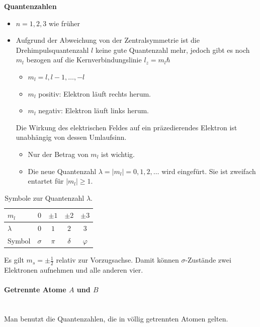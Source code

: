 \textbf{Quantenzahlen}
\begin{itemize}
	\item $n = 1,2,3$ wie früher
	\item Aufgrund der Abweichung von der Zentralsymmetrie ist die Drehimpulsquantenzahl $l$ keine gute Quantenzahl mehr, jedoch gibt es noch $m_{l}$ bezogen auf die Kernverbindungslinie $l_{z} = m_{l} \hbar $
		\begin{itemize}
			\item $m_{l} = l, l-1 ,\ldots, -l$ 
			\item $m_{l} $ positiv: Elektron läuft rechts herum.
			\item $m_{l} $ negativ: Elektron läuft links herum.
		\end{itemize}
		Die Wirkung des elektrischen Feldes auf ein präzedierendes Elektron ist unabhängig von dessen Umlaufsinn.
		\begin{itemize}[label= $\to$]
			\item Nur der Betrag von $m_{l}$ ist wichtig.
			\item Die neue Quantenzahl $ \lambda = \left| m_{l} \right| = 0, 1, 2, \ldots$ wird eingefürt. Sie ist zweifach entartet für $\left| m_{l} \right| \ge 1.$
		\end{itemize}
\end{itemize}

\begin{table}[htpb]
	\centering
	\caption{Symbole zur Quantenzahl $\lambda$.}
	\label{tab:label}
	\begin{tabular}{|l|c|c|c|c|}
	\hline
	$m_{l}$   & $0$       & $\pm 1$& $\pm 2$   & $\pm 3$     \\
	\hline
	\hline
	$\lambda$ & $0$       & $1$    & $2$       & $3$         \\
	\hline
	Symbol    & $ \sigma$ & $ \pi$ & $ \delta$ & $ \varphi$  \\
	\hline
	\end{tabular}
\end{table}
Es gilt $m_{s}= \pm \frac{1}{2}$ relativ zur Vorzugsachse. Damit können $ \sigma$-Zustände zwei Elektronen aufnehmen und alle anderen vier.\\

\paragraph{Getrennte Atome $A$ und $B$}~\\
Man benutzt die Quantenzahlen, die in völlig getrennten Atomen gelten.


